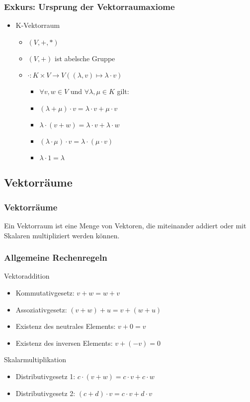 \begin{frame}
    \frametitle{Exkurs: Ursprung der Vektorraumaxiome}
    \begin{itemize}
        \item K-Vektorraum
        \begin{itemize}
            \item $(V,+,*)$
            \item $(V,+)$ ist abelsche Gruppe
            \item $\cdot: K \times V \rightarrow V ((\lambda, v) \mapsto \lambda \cdot v)$
            \begin{itemize}
                \item $\forall v,w \in V$ und $\forall \lambda, \mu \in K$ gilt:
                \item $(\lambda + \mu) \cdot v = \lambda \cdot v + \mu \cdot v$
                \item $\lambda \cdot (v + w) = \lambda \cdot v + \lambda \cdot w$
                \item $(\lambda \cdot \mu) \cdot v = \lambda \cdot (\mu \cdot v)$
                \item $\lambda \cdot 1 = \lambda$
            \end{itemize}
        \end{itemize}
    \end{itemize}
\end{frame}

\subsection{Vektorräume}
\begin{frame}
    \frametitle{Vektorräume}
    Ein Vektorraum ist eine Menge von Vektoren, die miteinander addiert oder mit Skalaren multipliziert werden können.
\end{frame}

\begin{frame}
    \frametitle{Allgemeine Rechenregeln}
    Vektoraddition
    \begin{itemize}
        \item Kommutativgesetz: $v + w = w + v$
        \item Assoziativgesetz: $(v + w) + u = v + (w + u)$
        \item Existenz des neutrales Elements: $v + 0 = v$
        \item Existenz des inversen Elements: $v + (-v) = 0$
    \end{itemize}

    Skalarmultiplikation
    \begin{itemize}
        \item Distributivgesetz 1: $c \cdot (v + w) = c \cdot v + c \cdot w$
        \item Distributivgesetz 2: $(c + d) \cdot v = c \cdot v + d \cdot v$
    \end{itemize}
\end{frame}